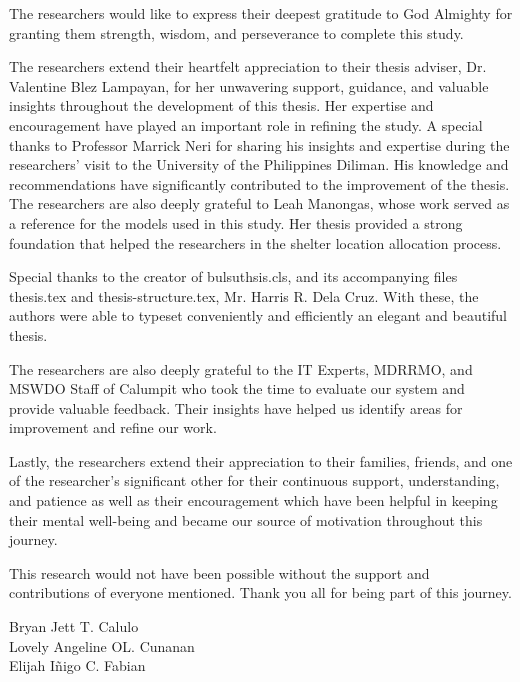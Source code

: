 \begin{acknowledgment}
	The researchers would like to express their deepest gratitude to God Almighty for granting them strength, wisdom, and perseverance to complete this study.
	
	The researchers extend their heartfelt appreciation to their thesis adviser, Dr. Valentine Blez Lampayan, for her unwavering support, guidance, and valuable insights throughout the development of this thesis. Her expertise and encouragement have played an important role in refining the study. A special thanks to Professor Marrick Neri for sharing his insights and expertise during the researchers’ visit to the University of the Philippines Diliman. His knowledge and recommendations have significantly contributed to the improvement of the thesis. The researchers are also deeply grateful to Leah Manongas, whose work served as a reference for the models used in this study. Her thesis provided a strong foundation that helped the researchers in the shelter location allocation process. 
	
	Special thanks to the creator of bulsuthsis.cls, and its accompanying files thesis.tex and thesis-structure.tex, Mr. Harris R. Dela Cruz. With these, the authors were able to typeset conveniently and efficiently an elegant and beautiful thesis.
	
	The researchers are also deeply grateful to the IT Experts, MDRRMO, and MSWDO Staff of Calumpit who took the time to evaluate our system and provide valuable feedback. Their insights have helped us identify areas for improvement and refine our work. 
	
	Lastly, the researchers extend their appreciation to their families, friends, and one of the researcher’s significant other for their continuous support, understanding, and patience as well as their encouragement which have been helpful in keeping their mental well-being and became our source of motivation throughout this journey.
	
	This research would not have been possible without the support and contributions of everyone mentioned. Thank you all for being part of this journey.
	
	\begin{flushright}
	Bryan Jett T. Calulo\\
	Lovely Angeline OL. Cunanan\\
	Elijah Iñigo C. Fabian\\
	\end{flushright}

\end{acknowledgment}
